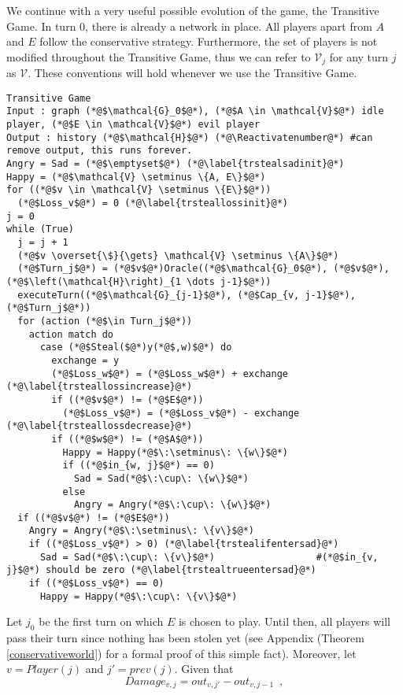 \documentclass[11pt]{llncs}
\makeatletter
\newcommand*\Suppressnumber{%
  \lst@AddToHook{OnNewLine}{%
    \let\thelstnumber\relax%
     \advance\c@lstnumber-\@ne\relax%
    }%
}
\theoremstyle{definition}
\makeatother
\begin{document}
     We continue with a very useful possible evolution of the game, the Transitive Game. In turn 0, there is already a network
     in place. All players apart from $A$ and $E$ follow the conservative strategy. Furthermore, the set of players is not
     modified throughout the Transitive Game, thus we can refer to $\mathcal{V}_j$ for any turn $j$ as $\mathcal{V}$. These
     conventions will hold whenever we use the Transitive Game.
     \Suppressnumber
     \begin{lstlisting}[label=transitivegame, style=numbers]
Transitive Game
Input : graph (*@$\mathcal{G}_0$@*), (*@$A \in \mathcal{V}$@*) idle player, (*@$E \in \mathcal{V}$@*) evil player
Output : history (*@$\mathcal{H}$@*) (*@\Reactivatenumber@*) #can remove output, this runs forever.
Angry = Sad = (*@$\emptyset$@*) (*@\label{trstealsadinit}@*)
Happy = (*@$\mathcal{V} \setminus \{A, E\}$@*)
for ((*@$v \in \mathcal{V} \setminus \{E\}$@*))
  (*@$Loss_v$@*) = 0 (*@\label{trsteallossinit}@*)
j = 0
while (True)
  j = j + 1
  (*@$v \overset{\$}{\gets} \mathcal{V} \setminus \{A\}$@*)
  (*@$Turn_j$@*) = (*@$v$@*)Oracle((*@$\mathcal{G}_0$@*), (*@$v$@*), (*@$\left(\mathcal{H}\right)_{1 \dots j-1}$@*))
  executeTurn((*@$\mathcal{G}_{j-1}$@*), (*@$Cap_{v, j-1}$@*), (*@$Turn_j$@*))
  for (action (*@$\in Turn_j$@*))
    action match do
      case (*@$Steal($@*)y(*@$,w)$@*) do
        exchange = y
        (*@$Loss_w$@*) = (*@$Loss_w$@*) + exchange (*@\label{trsteallossincrease}@*)
        if ((*@$v$@*) != (*@$E$@*))
          (*@$Loss_v$@*) = (*@$Loss_v$@*) - exchange (*@\label{trsteallossdecrease}@*)
        if ((*@$w$@*) != (*@$A$@*))
          Happy = Happy(*@$\:\setminus\: \{w\}$@*)
          if ((*@$in_{w, j}$@*) == 0)
            Sad = Sad(*@$\:\cup\: \{w\}$@*)
          else
            Angry = Angry(*@$\:\cup\: \{w\}$@*)
  if ((*@$v$@*) != (*@$E$@*))
    Angry = Angry(*@$\:\setminus\: \{v\}$@*)
    if ((*@$Loss_v$@*) > 0) (*@\label{trstealifentersad}@*) 
      Sad = Sad(*@$\:\cup\: \{v\}$@*)                  #(*@$in_{v, j}$@*) should be zero (*@\label{trstealtrueentersad}@*)
    if ((*@$Loss_v$@*) == 0)
      Happy = Happy(*@$\:\cup\: \{v\}$@*)
     \end{lstlisting}
     Let $j_0$ be the first turn on which $E$ is chosen to play. Until then, all players will pass their turn since nothing
     has been stolen yet (see Appendix (Theorem \ref{conservativeworld}) for a formal proof of this simple fact). Moreover,
     let $v = Player(j)$ and $j' = prev\left(j\right)$. Given that
     \begin{equation}
        Damage_{v,j} = out_{v, j'} - out_{v, j-1} \enspace,
     \end{equation}
\end{document}
